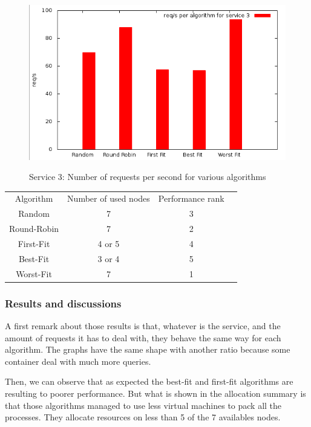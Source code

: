 \begin{figure}[h!]
\includegraphics[width=\textwidth]{./Images/BinPacking/exp2-service3.png}
\label{fig:exp2service3}
\caption{Service 3: Number of requests per second for various algorithms}
\end{figure}

\vspace{1em}
\begin{tabular}{c | c | c | c}
	Algorithm & Number of used nodes & Performance rank \\
	Random & 7 & 3 \\
	Round-Robin & 7 & 2 \\
	First-Fit & 4 or 5 & 4 \\
	Best-Fit & 3 or 4 & 5 \\
	Worst-Fit & 7 & 1 \\
\end{tabular}
\vspace{1em}

\subsubsection{Results and discussions}

A first remark about those results is that, whatever is the service, and the
amount of requests it has to deal with, they behave the same way for each
algorithm. The graphs have the same shape with another ratio because some
container deal with much more queries.

Then, we can observe that as expected the best-fit and first-fit algorithms are
resulting to poorer performance. But what is shown in the allocation summary is
that those algorithms managed to use less virtual machines to pack all the
processes. They allocate resources on less than 5 of the 7 availables nodes.

